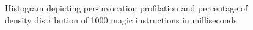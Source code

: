 
\begin{figure}
	\centering
	

	\caption{Histogram depicting per-invocation profilation and percentage of density distribution of 1000 magic instructions in milliseconds.}
	\label{fig:histogrammagicinstructionsforeach}
\end{figure}